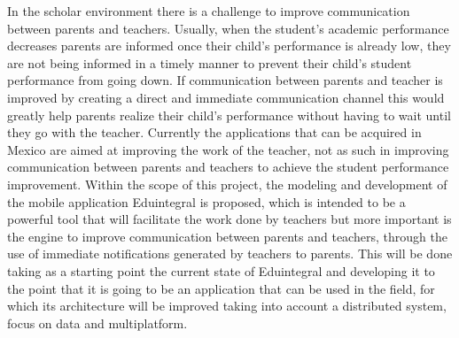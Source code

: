 
In the scholar environment there is a challenge to improve communication between parents and teachers. Usually, when the student's academic performance decreases parents are informed once their child's performance is already low, they are not being informed in a timely manner to prevent their child's student performance from going down. If communication between parents and teacher is improved by creating a direct and immediate communication channel this would greatly help parents realize their child's performance without having to wait until they go with the teacher. Currently the applications that can be acquired in Mexico are aimed at improving the work of the teacher, not as such in improving communication between parents and teachers to achieve the student performance improvement. Within the scope of this project, the modeling and development of the mobile application Eduintegral \cite{eduintegral} is proposed, which is intended to be a powerful tool that will facilitate the work done by teachers but more important is the engine to improve communication between parents and teachers, through the use of immediate notifications generated by teachers to parents. This will be done taking as a starting point the current state of Eduintegral \cite{eduintegral} and developing it to the point that it is going to be an application that can be used in the field, for which its architecture will be improved taking into account a distributed system, focus on data and multiplatform.